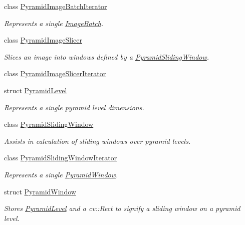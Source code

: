 \begin{DoxyCompactItemize}
class \hyperlink{classdg_1_1deepcore_1_1imagery_1_1_pyramid_image_batch_iterator}{Pyramid\+Image\+Batch\+Iterator}
\begin{DoxyCompactList}\small\item\em Represents a single \hyperlink{classdg_1_1deepcore_1_1imagery_1_1_image_batch}{Image\+Batch}. \end{DoxyCompactList}\item 
class \hyperlink{classdg_1_1deepcore_1_1imagery_1_1_pyramid_image_slicer}{Pyramid\+Image\+Slicer}
\begin{DoxyCompactList}\small\item\em Slices an image into windows defined by a \hyperlink{classdg_1_1deepcore_1_1imagery_1_1_pyramid_sliding_window}{Pyramid\+Sliding\+Window}. \end{DoxyCompactList}\item 
class \hyperlink{classdg_1_1deepcore_1_1imagery_1_1_pyramid_image_slicer_iterator}{Pyramid\+Image\+Slicer\+Iterator}
\item 
struct \hyperlink{structdg_1_1deepcore_1_1imagery_1_1_pyramid_level}{Pyramid\+Level}
\begin{DoxyCompactList}\small\item\em Represents a single pyramid level dimensions. \end{DoxyCompactList}\item 
class \hyperlink{classdg_1_1deepcore_1_1imagery_1_1_pyramid_sliding_window}{Pyramid\+Sliding\+Window}
\begin{DoxyCompactList}\small\item\em Assists in calculation of sliding windows over pyramid levels. \end{DoxyCompactList}\item 
class \hyperlink{classdg_1_1deepcore_1_1imagery_1_1_pyramid_sliding_window_iterator}{Pyramid\+Sliding\+Window\+Iterator}
\begin{DoxyCompactList}\small\item\em Represents a single \hyperlink{structdg_1_1deepcore_1_1imagery_1_1_pyramid_window}{Pyramid\+Window}. \end{DoxyCompactList}\item 
struct \hyperlink{structdg_1_1deepcore_1_1imagery_1_1_pyramid_window}{Pyramid\+Window}
\begin{DoxyCompactList}\small\item\em Stores \hyperlink{structdg_1_1deepcore_1_1imagery_1_1_pyramid_level}{Pyramid\+Level} and a cv\+::\+Rect to signify a sliding window on a pyramid level. \end{DoxyCompactList}\item 

\end{DoxyCompactItemize}

